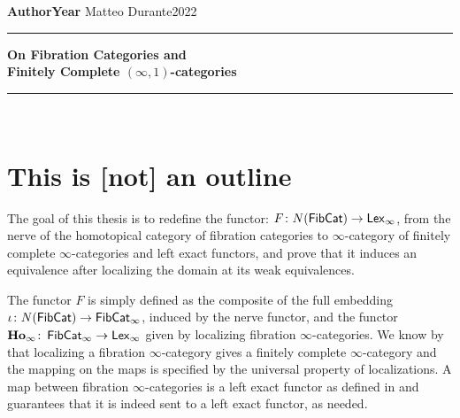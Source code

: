 \documentclass[a4paper,12pt]{scrartcl}
\begin{document}
\noindent\textbf{Author}\hfill\textbf{Year} \linebreak
\vspace*{-.1cm} Matteo Durante\hfill 2022 \\

\noindent
\rule{\linewidth}{1pt}
\begin{center}
\Large
    \textbf{On Fibration Categories and\\ Finitely Complete $(\infty,1)$-categories} \\
\end{center}
\rule{\linewidth}{1pt}
\\


\newcommand{\La}{\Lambda}
\newcommand{\pa}{c}
\newcommand{\ob}{\operatorname{Ob}}
\newcommand{\mor}{\operatorname{Mor}}
\newcommand{\sto}{\twoheadrightarrow}

\newcommand{\plim}{\varprojlim}
\newcommand{\sst}{\subseteq}
\newcommand{\eq}{\operatorname{eq}}

\newcommand{\f}{\varphi}

\newcommand{\sing}{\operatorname{Sing}}

\newcommand{\ihom}{\underline{\Hom}}

\section{This is [not] an outline}

The goal of this thesis is to redefine the functor: $F\colon
N(\operatorname{\mathsf{FibCat}})\rightarrow\operatorname{\mathsf{Lex}_\infty}$, from the nerve of the homotopical category of
fibration categories to $\infty$-category of finitely complete
$\infty$-categories and left exact functors, and prove that it induces an
equivalence after localizing the domain at its weak equivalences.

The functor $F$ is simply defined as the composite of the full embedding
$\iota\colon N(\operatorname{\mathsf{FibCat}})\rightarrow \operatorname{\mathsf{FibCat}}_\infty$, induced by the nerve
functor,  and the functor $\operatorname{\mathbf{Ho}_\infty}\colon
\operatorname{\mathsf{FibCat}}_\infty\rightarrow\operatorname{\mathsf{Lex}_\infty}$ given by localizing fibration
$\infty$-categories. We know by \cite[Thm.\ 7.5.6]{Cis19} that localizing a
fibration $\infty$-category gives a finitely complete $\infty$-category and the
mapping on the maps is specified by the universal property of localizations.
A map between fibration $\infty$-categories is a left exact functor as defined
in \cite[Def.\ 7.5.2]{Cis19} and \cite[Thm.\ 7.5.28]{Cis19} guarantees that it
is indeed sent to a left exact functor, as needed.
\end{document}
